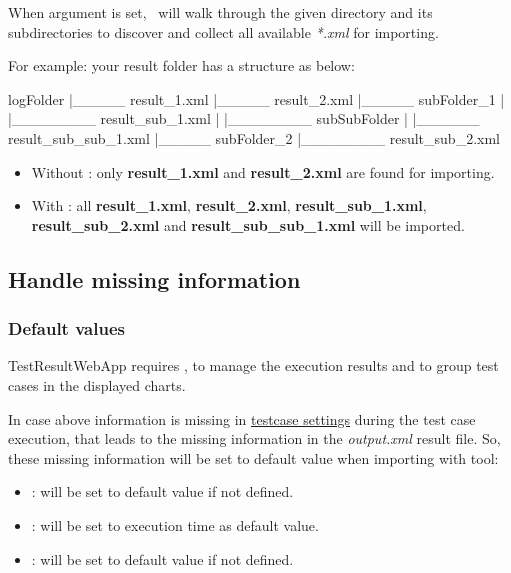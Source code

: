 When  argument is set, \pkg\ will walk
through the given directory and its subdirectories to discover and
collect all available \emph{*.xml} for importing.

For example: your result folder has a structure as below:

\begin{robotlog}
logFolder
   |_____ result_1.xml
   |_____ result_2.xml
   |_____ subFolder_1
   |         |________ result_sub_1.xml
   |         |________ subSubFolder
   |                       |______ result_sub_sub_1.xml
   |_____ subFolder_2
             |________ result_sub_2.xml
\end{robotlog}

\begin{itemize}
\tightlist
\item
  Without : only \textbf{result\_1.xml} and
  \textbf{result\_2.xml} are found for importing.
\item
  With : all \textbf{result\_1.xml},
  \textbf{result\_2.xml}, \textbf{result\_sub\_1.xml},
  \textbf{result\_sub\_2.xml} and \textbf{result\_sub\_sub\_1.xml} will
  be imported.
\end{itemize}

\subsection{Handle missing information}
\subsubsection{Default values}
TestResultWebApp requires ,  to manage the execution 
results and  to group test cases in the displayed charts.

In case above information is missing in 
\hyperref[description-robotframework-testcase-settings]{testcase settings} during the test 
case execution, that leads to the missing information in the \emph{output.xml} result file.
So, these missing information will be set to default value when importing with
\href{https://github.com/test-fullautomation/robotframework-robotlog2db}{\pkg} tool:

\begin{itemize}
\tightlist
\item {}: will be set to default value  if not defined.

\item {}: will be set to execution time  
                               as default value.

\item {}: will be set to default value  if not defined.
\end{itemize}

